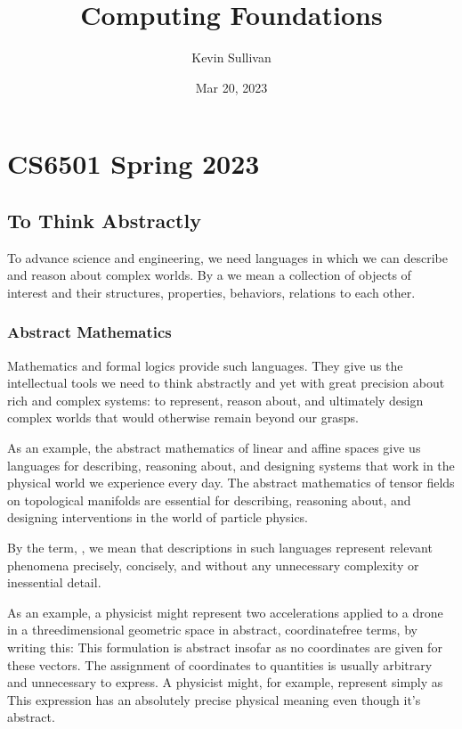 \documentclass[letterpaper,10pt,english]{sphinxmanual}
\title{Computing Foundations}
\date{Mar 20, 2023}
\author{Kevin Sullivan}
\begin{document}
\pagestyle{empty}
\sphinxmaketitle
\pagestyle{plain}
\sphinxtableofcontents
\pagestyle{normal}
\label{\detokenize{index::doc}}


\sphinxstepscope


\chapter{CS6501 Spring 2023}
\label{\detokenize{A_00_Introduction:cs6501-spring-2023}}\label{\detokenize{A_00_Introduction:introduction}}\label{\detokenize{A_00_Introduction::doc}}

\section{To Think Abstractly}
\label{\detokenize{A_00_Introduction:to-think-abstractly}}
\sphinxAtStartPar
To advance science and engineering, we need languages in
which we can describe and reason about complex worlds. By
a  we mean a collection of objects of interest and
their structures, properties, behaviors, relations to each
other.


\subsection{Abstract Mathematics}
\label{\detokenize{A_00_Introduction:abstract-mathematics}}
\sphinxAtStartPar
Mathematics and formal logics provide such languages. They
give us the intellectual tools we need to think abstractly
and yet with great precision about rich and complex systems:
to represent, reason about, and ultimately design complex
worlds that would otherwise remain beyond our grasps.

\sphinxAtStartPar
As an example, the abstract mathematics of linear and affine
spaces give us languages for describing, reasoning about, and
designing systems that work in the  physical world
we experience every day. The abstract mathematics of tensor
fields on topological manifolds are essential for describing,
reasoning about, and designing interventions in the 
world of particle physics.

\sphinxAtStartPar
By the term, , we mean that descriptions in such
languages represent relevant phenomena precisely, concisely,
and without any unnecessary complexity or inessential detail.

\sphinxAtStartPar
As an example, a physicist might represent two accelerations
applied to a drone in a three\sphinxhyphen{}dimensional geometric space in
abstract, coordinate\sphinxhyphen{}free terms, by writing this:  This formulation is abstract
insofar as no coordinates are given for these vectors. The
assignment of coordinates to  quantities is usually
arbitrary and unnecessary to express. A physicist might, for
example, represent  simply as
 This expression has an absolutely precise physical
meaning even though it’s abstract.
\end{document}
